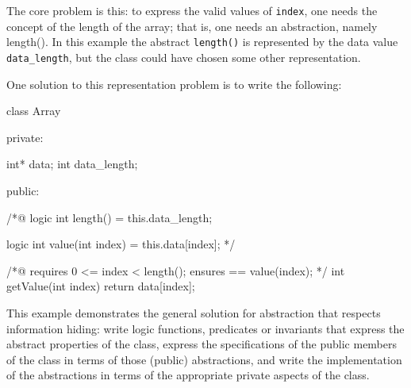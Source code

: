 The core problem is this: to express the valid values of \lstinline|index|, one needs the concept of the length of the array; that is, one needs an abstraction, namely length(). In this example the abstract \lstinline|length()| is represented by the data value \lstinline|data_length|, but the class could have chosen some other representation.

One solution to this representation problem is to write the following:

\begin{listing-nonumber}
class Array {
	
  private:
	
	int* data;
	int data_length;
	
  public:
	
	/*@
	   logic int length() = this.data_length; 
	   
	   logic int value(int index) = this.data[index];
	*/
	
	/*@ 
	   requires 0 <= index < length();
	   ensures \result == value(index);
	*/
	int getValue(int index) {
		return data[index];
	}
}
\end{listing-nonumber}

This example demonstrates the general solution for abstraction that respects information hiding: write logic functions, predicates or invariants that express the abstract properties of the class, express the specifications of the public members of the class in terms of those (public) abstractions, and write the implementation of the abstractions in terms of the appropriate private aspects of the class.

